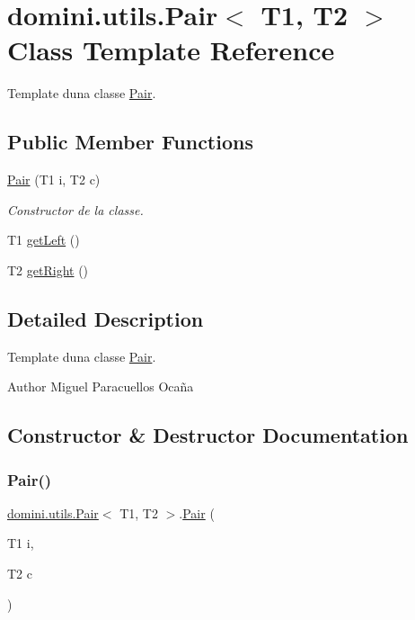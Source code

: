 \hypertarget{classdomini_1_1utils_1_1Pair}{}\section{domini.\+utils.\+Pair$<$ T1, T2 $>$ Class Template Reference}
\label{classdomini_1_1utils_1_1Pair}


Template d\textquotesingle{}una classe \hyperlink{classdomini_1_1utils_1_1Pair}{Pair}.  


\subsection*{Public Member Functions}
\begin{DoxyCompactItemize}
\item 
\hyperlink{classdomini_1_1utils_1_1Pair_a9db8755d5034cf4f99f9007b9d6fd22d}{Pair} (T1 i, T2 c)
\begin{DoxyCompactList}\small\item\em Constructor de la classe. \end{DoxyCompactList}\item 
T1 \hyperlink{classdomini_1_1utils_1_1Pair_a9439fbd8488cb1fbf00c57f15f093c4b}{get\+Left} ()
\item 
T2 \hyperlink{classdomini_1_1utils_1_1Pair_a0dca94eb1a43952258bebe1dca4c84e9}{get\+Right} ()
\end{DoxyCompactItemize}


\subsection{Detailed Description}
Template d\textquotesingle{}una classe \hyperlink{classdomini_1_1utils_1_1Pair}{Pair}. 

\begin{DoxyAuthor}{Author}
Miguel Paracuellos Ocaña 
\end{DoxyAuthor}


\subsection{Constructor \& Destructor Documentation}
\mbox{\label{classdomini_1_1utils_1_1Pair_a9db8755d5034cf4f99f9007b9d6fd22d}} 
\subsubsection{\texorpdfstring{Pair()}{Pair()}}
{\footnotesize\ttfamily \hyperlink{classdomini_1_1utils_1_1Pair}{domini.\+utils.\+Pair}$<$ T1, T2 $>$.\hyperlink{classdomini_1_1utils_1_1Pair}{Pair} (\begin{DoxyParamCaption}\item[{T1}]{i,  }\item[{T2}]{c }\end{DoxyParamCaption})\hspace{0.3cm}{\ttfamily [inline]}}



